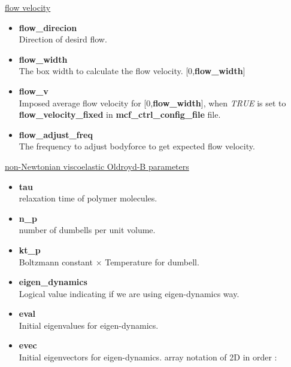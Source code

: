 \documentclass[a4paper,10pt]{article}
\begin{document}
\begin{center}
\underline{\textlangle flow velocity \textrangle}
\end{center}

\begin{itemize}
 
\item 
\textbf{flow\_direcion} \\
Direction of desird flow.

\item 
\textbf{flow\_width}    \\
The box width to calculate the flow velocity.
[0,\textbf{flow\_width}]
\item 
\textbf{flow\_v}  \\
Imposed average flow velocity for [0,\textbf{flow\_width}],
when \textit{TRUE} is set to \textbf{flow\_velocity\_fixed} 
in \textbf{mcf\_ctrl\_config\_file} file.

\item 
\textbf{flow\_adjust\_freq} \\
The frequency to adjust bodyforce to get 
expected flow velocity.

\end{itemize}

\begin{center}
\underline{\textlangle non-Newtonian viscoelastic Oldroyd-B parameters \textrangle}
\end{center}
 
\begin{itemize}
 
\item  
\textbf{tau} \\
relaxation time of polymer molecules.

\item 
\textbf{n\_p} \\
number of dumbells per unit volume.

\item 
\textbf{kt\_p} \\
Boltzmann constant $\times$ Temperature for dumbell.

\item  
\textbf{eigen\_dynamics} \\
Logical value indicating if we are
using eigen-dynamics way.

\item 
\textbf{eval} \\
Initial eigenvalues for eigen-dynamics.

\item 
\textbf{evec}  \\
Initial eigenvectors for eigen-dynamics.
array notation of 2D in order :

\end{itemize}
\end{document}
